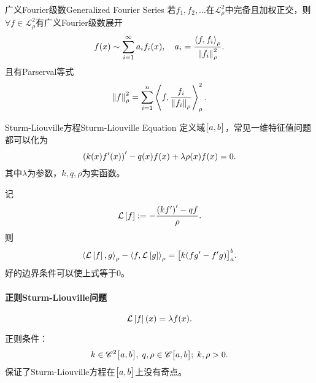 \begin{theorem}{广义Fourier级数}{Generalized Fourier Series}
	若$f_1,f_2,\ldots$在$\mathscr L_\rho^2$中完备且加权正交，则$\forall f\in\mathscr L_\rho^2$有广义Fourier级数展开
	\[
		f(x)\sim\sum_{i=1}^\infty a_if_i(x),\quad a_i=\frac{\left\langle f,f_i\right\rangle_\rho}{\left\lVert f_i\right\rVert^2_\rho}.
	\]
	且有Parserval等式
	\[
		\left\lVert f\right\rVert_\rho^2=\sum_{i=1}^n\left\langle f,\frac{f_i}{\left\lVert f_i\right\rVert_\rho}\right\rangle_\rho^2.
	\]
\end{theorem}
\begin{definition}{Sturm-Liouville方程}{Sturm-Liouville Equation}
	定义域$\bigl[a,b\bigr]$，常见一维特征值问题都可以化为
	\[
		\left(k(x)f'(x)\right)'-q(x)f(x)+\lambda\rho(x)f(x)=0.
	\]
	其中$\lambda$为参数，$k,q,\rho$为实函数。

	记
	\[
		\mathcal L\left[f\right]:=-\frac{\left(kf'\right)'-qf}\rho.
	\]
	则
	\[
		\left\langle \mathcal L\left[f\right],g\right\rangle_\rho-\left\langle f,\mathcal L\left[g\right]\right\rangle_\rho=\bigl[k(fg'-f'g)\bigr]_a^b.
	\]
	好的边界条件可以使上式等于0。
\end{definition}
\paragraph*{正则Sturm-Liouville问题}
\[
	\mathcal L\left[f\right](x)=\lambda f(x).
\]

正则条件：
\[
	k\in\mathscr C^2\bigl[a,b\bigr],\;q,\rho\in\mathscr C\bigl[a,b\bigr];\;k,\rho>0.
\]
保证了Sturm-Liouville方程在$\bigl[a,b\bigr]$上没有奇点。

